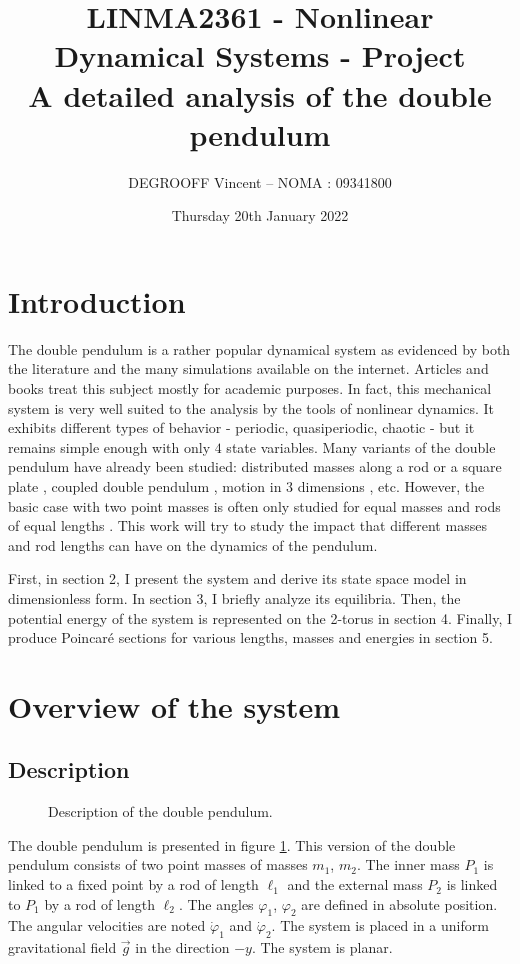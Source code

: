 \documentclass[11 pt]{article}
\title{%
LINMA2361 - Nonlinear Dynamical Systems - Project\\
A detailed analysis of the double pendulum
}
\author{DEGROOFF Vincent \quad -- \quad NOMA : 09341800}
\date{Thursday 20th January 2022}
\begin{document}
\maketitle

\section{Introduction}
The double pendulum is a rather popular dynamical system as evidenced by both the literature and the many simulations available on the internet. Articles and books treat this subject mostly for academic purposes. In fact, this mechanical system is very well suited to the analysis by the tools of nonlinear dynamics. It exhibits different types of behavior - periodic, quasiperiodic, chaotic - but it remains simple enough with only $4$ state variables. Many variants of the double pendulum have already been studied: distributed masses along a rod \cite{enwikiDoublePendulum} or a square plate \cite{squareDblPendulum}, coupled double pendulum \cite{mastersthesis}, motion in 3 dimensions \cite{DoublePendulum3D}, etc. However, the basic case with two point masses is often only studied for equal masses and rods of equal lengths \cite{ChaosPC} \cite{codeproject} \cite{STACHOWIAK2006417}. This work will try to study  the impact that different masses and rod lengths can have on the dynamics of the pendulum.

First, in section 2, I present the system and derive its state space model in dimensionless form. In section 3, I briefly analyze its equilibria. Then, the potential energy of the system is represented on the 2-torus in section 4. Finally, I produce Poincaré sections for various lengths, masses and energies in section 5.

\section{Overview of the system}

\subsection{Description}
\begin{figure}[htp]
    \centering
    
    \caption{Description of the double pendulum.}
    \label{fig:description}
\end{figure}

The double pendulum is presented in figure \ref{fig:description}. This version of the double pendulum consists of two point masses of masses $m_1$, $m_2$. The inner mass $P_1$ is linked to a fixed point by a rod of length $\ell_1$ and the external mass $P_2$ is linked to $P_1$ by a rod of length $\ell_2$. The angles $\varphi_1$, $\varphi_2$ are defined in absolute position. The angular velocities are noted $\dot \varphi_1$ and $\dot \varphi_2$. The system is placed in a uniform gravitational field $\Vec{g}$ in the direction $-y$. The system is planar.
\end{document}
